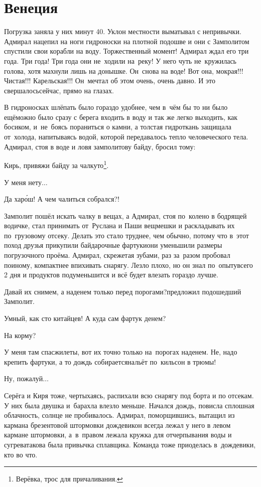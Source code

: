 \chapter{Венеция}
\vepsianrose

Погрузка заняла у них минут 40. Уклон местности выматывал с непривычки. Адмирал нацепил на ноги гидроноски на плотной подошве и они с Замполитом спустили свои корабли на воду. Торжественный момент! Адмирал ждал его три года. Три года! Три года они не~ходили на~реку! У него чуть не~кружилась голова, хотя махнули лишь на донышке. Он~снова на воде! Вот она, мокрая!!! Чистая!!! Карельская!!! Он~мечтал об этом очень, очень давно. И это свершалось\mdash сейчас, прямо на глазах.

В гидроносках шлёпать было гораздо удобнее, чем в~чём бы то ни было ещё\mdash можно было сразу с берега входить в воду и так же легко выходить, как босиком, и~не~боясь пораниться о камни, а толстая гидроткань защищала от~холода, напитываясь водой, которой передавалось тепло человеческого тела. Адмирал, стоя в воде и ловя замполитову байду, бросил тому:

\diagdash Кирь, привяжи байду за чалку\sdash то\footnote{Верёвка, трос для причаливания.}.

\diagdash У меня нету$\ldots$

\diagdash Да хар\'{о}ш! А чем чалиться собрался?!

Замполит пошёл искать чалку в вещах, а Адмирал, стоя по~колено в бодрящей водичке, стал принимать от~Руслана и Паши вещмешки и раскладывать их по~грузовому отсеку. Делать это стало труднее, чем обычно, потому что в~этот поход друзья прикупили байдарочные фартуки\mdash они уменьшили размеры погрузочного проёма. Адмирал, скрежетая зубами, раз за~разом пробовал по\sdash иному, компактнее впихивать снарягу. Лезло плохо, но он знал по~опыту\mdash всего 2 дня и продуктов подуменьшится и всё будет влезать гораздо лучше.

\diagdash Давай их снимем, а наденем только перед порогами?\mdash предложил подошедший Замполит. 

\diagdash Умный, как сто китайцев! А куда сам фартук денем? 

\diagdash На корму?

\diagdash У меня там спасжилеты, вот их точно только на~порогах наденем. Не, надо крепить фартуки, а то дождь собирается\mdash нальёт по~кильсон в трюмы!

\diagdash Ну, пожалуй$\ldots$

Серёга и Киря тоже, чертыхаясь, распихали всю снарягу под борта и по отсекам. У них была двушка и~барахла влезло меньше. Начался дождь, повисла сплошная облачность, солнце не пробивалось. Адмирал, поморщившись, вытащил из кармана брезентовой штормовки дождевик\mdash он всегда лежал у него в левом кармане штормовки, а~в~правом лежала кружка для отчерпывания воды и сугрева\mdash такова была привычка сплавщика. Команда тоже приоделась в~дождевики, кто во что.

